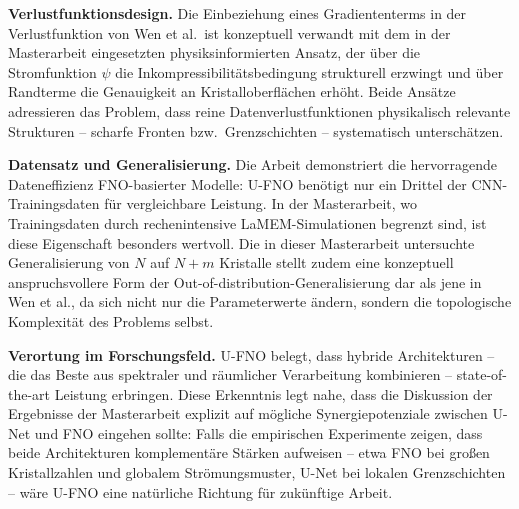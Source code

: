 \documentclass[a4paper,12pt]{article}
\begin{document}
\textbf{Verlustfunktionsdesign.}
Die Einbeziehung eines Gradiententerms in der Verlustfunktion von Wen et al.\
ist konzeptuell verwandt mit dem in der Masterarbeit eingesetzten
physiksinformierten Ansatz, der über die Strom\-funktion $\psi$ die
Inkompressibilitätsbedingung strukturell erzwingt und über Randterme die
Genauigkeit an Kristalloberflächen erhöht. Beide Ansätze adressieren das
Problem, dass reine Datenverlustfunktionen physikalisch relevante Strukturen
-- scharfe Fronten bzw.\ Grenzschichten -- systematisch unterschätzen.

\textbf{Datensatz und Generalisierung.}
Die Arbeit demonstriert die hervorragende Dateneffizienz FNO-basierter Modelle:
U-FNO benötigt nur ein Drittel der CNN-Trainingsdaten für vergleichbare
Leistung. In der Masterarbeit, wo Trainingsdaten durch rechenintensive
LaMEM-Simulationen begrenzt sind, ist diese Eigenschaft besonders
wertvoll. Die in dieser Masterarbeit untersuchte Generalisierung von
$N$ auf $N+m$ Kristalle stellt zudem eine konzeptuell anspruchsvollere Form
der Out-of-distribution-Generalisierung dar als jene in Wen et al., da sich
nicht nur die Parameterwerte ändern, sondern die topologische Komplexität
des Problems selbst.

\textbf{Verortung im Forschungsfeld.}
U-FNO belegt, dass hybride Architekturen -- die das Beste aus spektraler und
räumlicher Verarbeitung kombinieren -- state-of-the-art Leistung erbringen.
Diese Erkenntnis legt nahe, dass die Diskussion der Ergebnisse der Masterarbeit
explizit auf mögliche Synergiepotenziale zwischen U-Net und FNO eingehen
sollte: Falls die empirischen Experimente zeigen, dass beide Architekturen
komplementäre Stärken aufweisen -- etwa FNO bei großen Kristallzahlen und
globalem Strömungsmuster, U-Net bei lokalen Grenzschichten -- wäre U-FNO
eine natürliche Richtung für zukünftige Arbeit.
\end{document}
